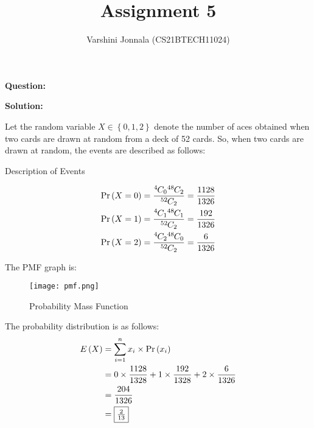 \documentclass[journal,12pt,twocolumn]{IEEEtran}
\title{Assignment 5}
\author{Varshini Jonnala (CS21BTECH11024)}
\newcommand{\question}{\noindent \textbf{Question: }}
\newcommand{\solution}{\noindent \textbf{Solution: }}
\providecommand{\pr}[1]{\ensuremath{\Pr\left(#1\right)}}
\providecommand{\cbrak}[1]{\ensuremath{\left\{#1\right\}}}
\providecommand{\brak}[1]{\ensuremath{\left(#1\right)}}
\newcommand*{\permcomb}[4][0mu]{{{}^{#3}\mkern#1#2_{#4}}}
\newcommand*{\comb}[1][-1mu]{\permcomb[#1]{C}}
\begin{document}
\maketitle
\question

    
\solution 


 Let the random variable $X \in \cbrak{0,1,2}$ denote the number of aces obtained when two cards are drawn at random from a deck of 52 cards. So, when two cards are drawn at random, the events are described as follows:

    \begin{table}[ht!]
        \centering
        
    	\caption{Description of Events}
    	\label{Tables:Table}
    \end{table}
    
    \begin{align}
        \pr{X = 0} = \frac{\comb{4}{0} \comb{48}{2}}{\comb{52}{2}} = \frac{1128}{1326}\\
         \pr{X = 1} = \frac{\comb{4}{1} \comb{48}{1}}{\comb{52}{2}} = \frac{192}{1326}\\
          \pr{X = 2} = \frac{\comb{4}{2} \comb{48}{0}}{\comb{52}{2}} = \frac{6}{1326}
    \end{align}
    
    The PMF graph is:
    \begin{figure}[!ht]
		\centering
		\texttt{[image: pmf.png]}
		\caption{Probability Mass Function}
		\label{fig1}
	\end{figure}
	
    The probability distribution is as follows:
    \begin{align}
    E\brak{X} &= \sum_{i = 1}^{n}x_i \times \pr{x_i}\\
    &= 0 \times \frac{1128}{1328} + 1 \times \frac{192}{1328} + 2\times \frac{6}{1326}\\
    &= \frac{204}{1326}\\
    &= \fbox{$\frac{2}{13}$}
    \end{align}
\end{document}
